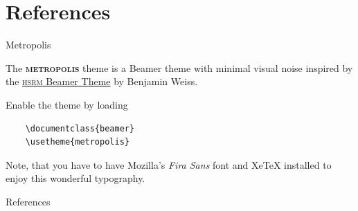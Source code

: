 \documentclass[10pt]{beamer}
\newcommand{\themename}{\textbf{\textsc{metropolis}}\xspace}
\begin{document}
\section{References}

\begin{frame}[fragile]{Metropolis}

  The \themename theme is a Beamer theme with minimal visual noise
  inspired by the \href{https://github.com/hsrmbeamertheme/hsrmbeamertheme}{\textsc{hsrm} Beamer
  Theme} by Benjamin Weiss.

  Enable the theme by loading

  \begin{verbatim}    \documentclass{beamer}
    \usetheme{metropolis}\end{verbatim}

  Note, that you have to have Mozilla's \emph{Fira Sans} font and XeTeX
  installed to enjoy this wonderful typography.
\end{frame}

\begin{frame}[allowframebreaks]{References}

  
  

\end{frame}
\end{document}

